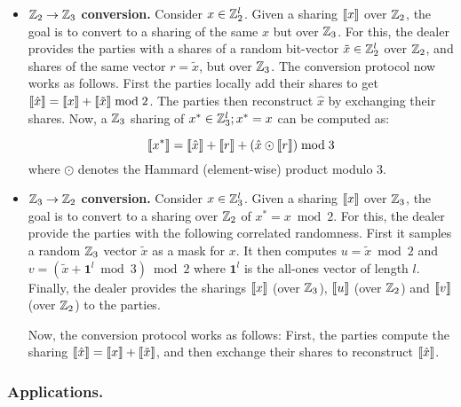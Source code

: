 \begin{itemize}
    \item \textbf{$\mathbb{Z}_2 \to \mathbb{Z}_3$ conversion.} Consider $x \in \mathbb{Z}_2^l$. Given a sharing $\left\llbracket x \right\rrbracket$ over $\mathbb{Z}_2$, the goal is to convert to a sharing of the same $x$ but over $\mathbb{Z}_3$. For this, the dealer provides the parties with a shares of a random bit-vector $\tilde{x} \in \mathbb{Z}_2^l$ over $\mathbb{Z}_2$, and shares of the same vector $r = \tilde{x}$, but over $\mathbb{Z}_3$. The conversion protocol now works as follows. First the parties locally add their shares to get $\left\llbracket \hat{x} \right\rrbracket = \left\llbracket x \right\rrbracket + \left\llbracket \tilde{x} \right\rrbracket \bmod 2$. The parties then reconstruct $\hat{x}$ by exchanging their shares. Now, a $\mathbb{Z}_3$ sharing of $x^* \in \mathbb{Z}_3^l; x^* = x$ can be computed as:

    \[
        \left\llbracket x^* \right\rrbracket = \left\llbracket \hat{x} \right\rrbracket + \left\llbracket r \right\rrbracket + (\hat{x} \odot \left\llbracket r \right\rrbracket) \bmod 3
    \]
    where $\odot$ denotes the Hammard (element-wise) product modulo 3.

    \item \textbf{$\mathbb{Z}_3 \to \mathbb{Z}_2$ conversion.}
    Consider $x \in \mathbb{Z}_3^l$. Given a sharing $\left\llbracket x \right\rrbracket$ over $\mathbb{Z}_3$, the goal is to convert to a sharing over $\mathbb{Z}_2$ of $x^* = x \bmod 2$. For this, the dealer provide the parties with the following correlated randomness. First it samples a random $\mathbb{Z}_3$ vector $\tilde{x}$ as a mask for $x$. It then computes $u = \tilde{x} \bmod 2$ and $v = (\tilde{x} + \textbf{1}^l \bmod 3) \bmod 2$ where $\textbf{1}^l$ is the all-ones vector of length $l$. Finally, the dealer provides the sharings $\left\llbracket x \right\rrbracket$ (over $\mathbb{Z}_3$), $\left\llbracket u \right\rrbracket$ (over $\mathbb{Z}_2$) and $\left\llbracket v \right\rrbracket$ (over $\mathbb{Z}_2$) to the parties.

    \hspace*{1em} Now, the conversion protocol works as follows: First, the parties compute the sharing $\left\llbracket \hat{x} \right\rrbracket = \left\llbracket x \right\rrbracket + \left\llbracket \tilde{x} \right\rrbracket$, and then exchange their shares to reconstruct $\left\llbracket \hat{x} \right\rrbracket$.

\end{itemize}


\subsubsection{Applications.}


\newpage
